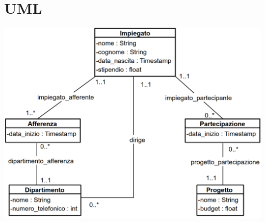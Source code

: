 \documentclass{article}
\begin{document}

\section{UML}

\includegraphics[width=\textwidth]{UML.png}
\end{document}
